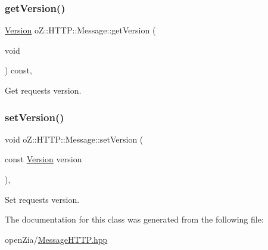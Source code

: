 \subsubsection{\texorpdfstring{getVersion()}{getVersion()}}
{\footnotesize\ttfamily \mbox{\hyperlink{structo_z_1_1_h_t_t_p_1_1_version}{Version}} o\+Z\+::\+H\+T\+T\+P\+::\+Message\+::get\+Version (\begin{DoxyParamCaption}\item[{void}]{ }\end{DoxyParamCaption}) const\hspace{0.3cm}{\ttfamily [inline]}, {\ttfamily [noexcept]}}



Get request\textquotesingle{}s version. 

\mbox{\label{classo_z_1_1_h_t_t_p_1_1_message_ac3fa35df570a24f54999e1091fac0726}} 
\subsubsection{\texorpdfstring{setVersion()}{setVersion()}}
{\footnotesize\ttfamily void o\+Z\+::\+H\+T\+T\+P\+::\+Message\+::set\+Version (\begin{DoxyParamCaption}\item[{const \mbox{\hyperlink{structo_z_1_1_h_t_t_p_1_1_version}{Version}}}]{version }\end{DoxyParamCaption})\hspace{0.3cm}{\ttfamily [inline]}, {\ttfamily [noexcept]}}



Set request\textquotesingle{}s version. 



The documentation for this class was generated from the following file\+:\begin{DoxyCompactItemize}
\item 
open\+Zia/\mbox{\hyperlink{_message_h_t_t_p_8hpp}{Message\+H\+T\+T\+P.\+hpp}}\end{DoxyCompactItemize}
